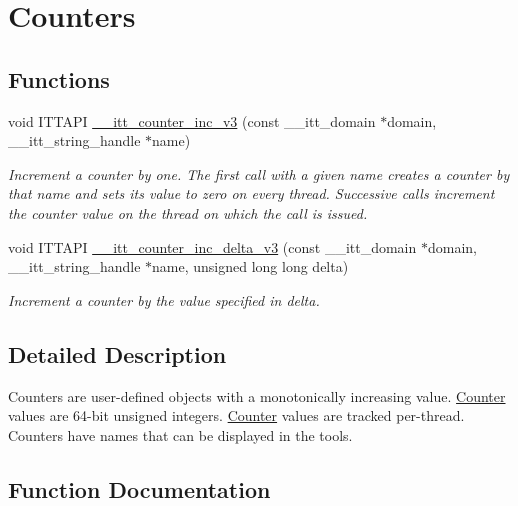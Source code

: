 \hypertarget{group__counters}{}\section{Counters}
\label{group__counters}
\subsection*{Functions}
\begin{DoxyCompactItemize}
\item 
void I\+T\+T\+A\+P\+I \hyperlink{group__counters_gaa4f0172a7816793aa8adb3bb02a9500d}{\+\_\+\+\_\+itt\+\_\+counter\+\_\+inc\+\_\+v3} (const \+\_\+\+\_\+itt\+\_\+domain $\ast$domain, \+\_\+\+\_\+itt\+\_\+string\+\_\+handle $\ast$name)
\begin{DoxyCompactList}\small\item\em Increment a counter by one. The first call with a given name creates a counter by that name and sets its value to zero on every thread. Successive calls increment the counter value on the thread on which the call is issued. \end{DoxyCompactList}\item 
void I\+T\+T\+A\+P\+I \hyperlink{group__counters_gaff266e66512b9314d16b16c1e67ef1f1}{\+\_\+\+\_\+itt\+\_\+counter\+\_\+inc\+\_\+delta\+\_\+v3} (const \+\_\+\+\_\+itt\+\_\+domain $\ast$domain, \+\_\+\+\_\+itt\+\_\+string\+\_\+handle $\ast$name, unsigned long long delta)
\begin{DoxyCompactList}\small\item\em Increment a counter by the value specified in delta. \end{DoxyCompactList}\end{DoxyCompactItemize}


\subsection{Detailed Description}
Counters are user-\/defined objects with a monotonically increasing value. \hyperlink{structCounter}{Counter} values are 64-\/bit unsigned integers. \hyperlink{structCounter}{Counter} values are tracked per-\/thread. Counters have names that can be displayed in the tools. 

\subsection{Function Documentation}
\hypertarget{group__counters_gaff266e66512b9314d16b16c1e67ef1f1}{}
